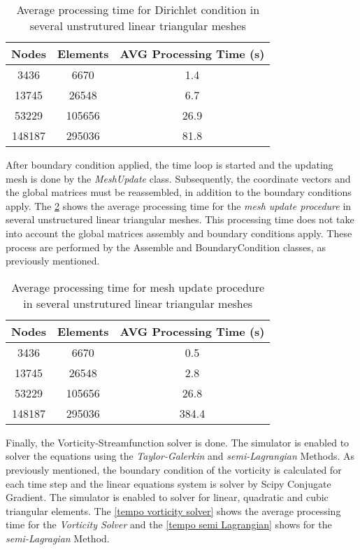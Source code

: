 \vspace{0.5cm}
\begin{table}[H]
\centering
\begin{tabular}{ccc}
\toprule
\textbf{Nodes} & \textbf{Elements} & \textbf{AVG Processing Time} (s) \\
\midrule
3436 & 6670 & 1.4 \\
13745 & 26548 & 6.7 \\
53229 & 105656 & 26.9 \\
148187 & 295036 & 81.8 \\



\bottomrule
\end{tabular}
\caption{Average processing time for Dirichlet condition in several unstrutured linear triangular meshes}
\label{tempo contorno}
\end{table}
 
\medskip
After boundary condition applied, the time loop is started and
the updating mesh is done by the \textit{MeshUpdate} class.
Subsequently, the coordinate vectors and the global matrices
must be reassembled, in addition to the boundary conditions apply.
The \ref{tempo mesh update} 
shows the average processing time for the \textit{mesh update procedure}
in several unstructured linear triangular meshes.
This processing time does not take into account the global matrices assembly and
boundary conditions apply. These process are performed by the
Assemble and BoundaryCondition classes, as previously mentioned. 

\vspace{0.5cm}
\begin{table}[H]
\centering
\begin{tabular}{ccc}
\toprule
\textbf{Nodes} & \textbf{Elements} & \textbf{AVG Processing Time} (s) \\
\midrule
3436 & 6670 & 0.5 \\
13745 & 26548 & 2.8 \\
53229 & 105656 & 26.8 \\
148187 & 295036 & 384.4 \\



\bottomrule
\end{tabular}
\caption{Average processing time for mesh update procedure in several unstrutured linear triangular meshes}
\label{tempo mesh update}
\end{table}


\medskip
Finally, the Vorticity-Streamfunction solver is done. 
The simulator is enabled to solver the equations using the
\textit{Taylor-Galerkin} and \textit{semi-Lagrangian} Methods.
As previously mentioned, the boundary condition of the vorticity
is calculated for each time step and 
the linear equations system is solver by Scipy Conjugate Gradient.
The simulator is enabled to solver for linear, quadratic and cubic
triangular elements. The \ref{tempo vorticity solver} 
shows the average processing time for the \textit{Vorticity Solver}
and the \ref{tempo semi Lagrangian} 
shows for the \textit{semi-Lagragian} Method.

